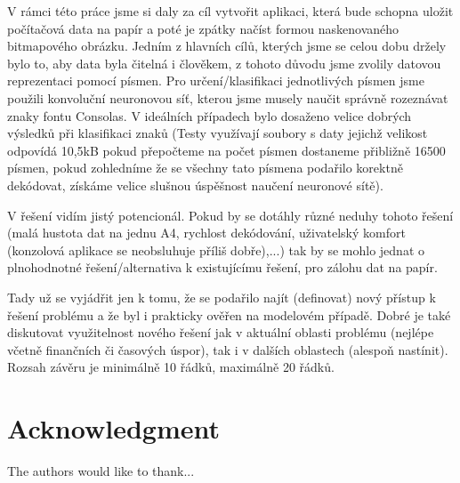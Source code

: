 \documentclass[conference]{IEEEtran}
\begin{document}
V rámci této práce jsme si daly za cíl vytvořit aplikaci, která bude schopna uložit počítačová data na papír a poté je zpátky načíst formou naskenovaného bitmapového obrázku. Jedním z hlavních cílů, kterých jsme se celou dobu držely bylo to, aby data byla čitelná i člověkem, z tohoto důvodu jsme zvolily datovou reprezentaci pomocí písmen. Pro určení/klasifikaci jednotlivých písmen jsme použili konvoluční neuronovou síť, kterou jsme musely naučit správně rozeznávat znaky fontu Consolas. V ideálních případech bylo dosaženo velice dobrých výsledků při klasifikaci znaků (Testy využívají soubory s daty jejichž velikost odpovídá 10,5kB pokud přepočteme na počet písmen dostaneme přibližně 16500 písmen, pokud zohledníme že se všechny tato písmena podařilo korektně dekódovat, získáme velice slušnou úspěšnost naučení neuronové sítě). 

V řešení vidím jistý potencionál. Pokud by se dotáhly různé neduhy tohoto řešení (malá hustota dat na jednu A4, rychlost dekódování, uživatelský komfort (konzolová aplikace se neobsluhuje příliš dobře),...) tak by se mohlo jednat o plnohodnotné řešení/alternativa k existujícímu řešení, pro zálohu dat na papír.

Tady už se vyjádřit jen k tomu, že se podařilo najít (definovat) nový přístup k řešení problému a že byl i prakticky ověřen na modelovém případě. 
Dobré je také diskutovat využitelnost nového řešení jak v aktuální oblasti problému (nejlépe včetně finančních či časových úspor), tak i v dalších oblastech (alespoň nastínit).
Rozsah závěru je minimálně 10 řádků, maximálně 20 řádků.







\section*{Acknowledgment}


The authors would like to thank...





\end{document}
